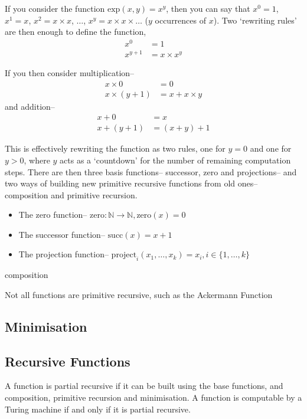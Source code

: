 If you consider the function $\mathrm{exp}(x,y) = x^y$, then you can say that $x^0 = 1$, $x^1 = x$, $x^2 = x \times x$,
 $\ldots$, $x^y = x \times x \times \ldots$ ($y$ occurrences of $x$). Two `rewriting rules' are then enough to define
 the function,
\begin{align*}
  x^0 &= 1\\
  x^{y + 1} &= x \times x^y
\end{align*}

If you then consider multiplication--
\begin{align*}
  x \times 0 &= 0\\
  x \times (y + 1) &= x + x \times y
\end{align*}
and addition--
\begin{align*}
  x + 0 &= x\\
  x + (y + 1) &= (x + y) + 1
\end{align*}

This is effectively rewriting the function as two rules, one for $y = 0$ and one for $y > 0$, where $y$ acts as a
 `countdown' for the number of remaining computation steps. There are then three basis functions-- successor, zero and
 projections-- and two ways of building new primitive recursive functions from old ones-- composition and primitive
 recursion.

\begin{itemize}
  \item The zero function-- $\mathrm{zero}: \mathbb{N} \rightarrow \mathbb{N}, \mathrm{zero}(x) = 0$
  \item The successor function-- $\mathrm{succ}(x) = x + 1$
  \item The projection function-- $\mathrm{project}_i (x_1, \ldots, x_k) = x_i, i \in \{1, \ldots, k\}$
\end{itemize}

{\huge composition}

Not all functions are primitive recursive, such as the Ackermann Function

\subsection*{Minimisation}

\subsection*{Recursive Functions}

A function is partial recursive if it can be built using the base functions, and composition, primitive recursion and
 minimisation. A function is computable by a Turing machine if and only if it is partial recursive.